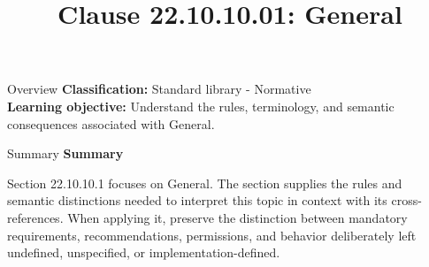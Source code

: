 \documentclass[10pt,letterpaper]{article}
\title{Clause 22.10.10.01: General}
\author{}
\date{}
\begin{document}
\maketitle
\begin{CornellOverviewBox}{Overview}
\textbf{Classification:} Standard library - Normative\\[2pt]
\textbf{Learning objective:} Understand the rules, terminology, and semantic consequences associated with General.
\end{CornellOverviewBox}\begin{CornellSummaryBox}{Summary}
{\sffamily\bfseries\color{Accent} Summary}\par\vspace{3pt}Section 22.10.10.1 focuses on General. The section supplies the rules and semantic distinctions needed to interpret this topic in context with its cross-references. When applying it, preserve the distinction between mandatory requirements, recommendations, permissions, and behavior deliberately left undefined, unspecified, or implementation-defined.
\end{CornellSummaryBox}
\end{document}
